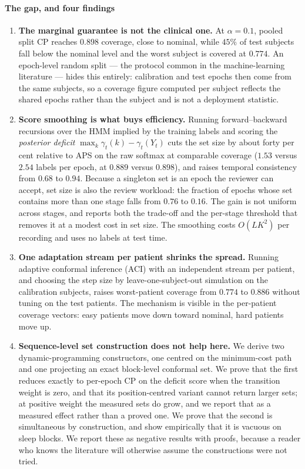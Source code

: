 \paragraph{The gap, and four findings}
\begin{enumerate}
\item \textbf{The marginal guarantee is not the clinical one.} At
      $\alpha=0.1$, pooled split CP reaches $0.898$ coverage, close to
      nominal, while $45\%$ of test subjects fall below the nominal level
      and the worst subject is covered at $0.774$. An epoch-level random
      split --- the protocol common in the machine-learning literature ---
      hides this entirely: calibration and test epochs then come from the
      same subjects, so a coverage figure computed per subject reflects the
      shared epochs rather than the subject and is not a deployment
      statistic.
\item \textbf{Score smoothing is what buys efficiency.} Running
      forward--backward recursions over the HMM implied by the training
      labels and scoring the \emph{posterior deficit}
      $\max_k \gamma_t(k)-\gamma_t(Y_t)$ cuts the set size by about forty per
      cent relative to APS on the raw softmax at comparable coverage
      ($1.53$ versus $2.54$ labels per epoch, at $0.889$ versus $0.898$), and raises temporal
      consistency from $0.68$ to $0.94$. Because a singleton set is an epoch
      the reviewer can accept, set size is also the review workload: the
      fraction of epochs whose set contains more than one stage falls from
      $0.76$ to $0.16$. The gain is not uniform across stages, and
       reports both the trade-off and the per-stage
      threshold that removes it at a modest cost in set size. The smoothing
      costs $O(LK^2)$ per recording and uses no labels at test time.
\item \textbf{One adaptation stream per patient shrinks the spread.} Running
      adaptive conformal inference (ACI) with an independent stream per
      patient, and choosing the step size by leave-one-subject-out simulation
      on the calibration subjects, raises worst-patient coverage from
      $0.774$ to $0.886$ without tuning on the test patients. The
      mechanism is visible in the per-patient coverage vectors: easy patients
      move down toward nominal, hard patients move up.
\item \textbf{Sequence-level set construction does not help here.} We derive
      two dynamic-programming constructors, one centred on the minimum-cost
      path and one projecting an exact block-level conformal set. We prove
      that the first reduces exactly to per-epoch CP on the deficit score when
      the transition weight is zero, and that its position-centred variant
      cannot return larger sets; at positive weight the measured sets do grow,
      and we report that as a measured effect rather than a proved one. We
      prove that the second is simultaneous by construction, and
      show empirically that it is vacuous on sleep blocks. We report these as
      negative results with proofs, because a reader who knows the
      literature will otherwise assume the constructions were not tried.
\end{enumerate}

